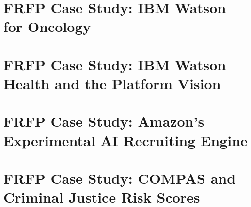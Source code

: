 \documentclass[11pt,oneside]{book}
\begin{document}

%





\chapter{FRFP Case Study: IBM Watson for Oncology}
\label{ch:cs-watson-oncology}


\chapter{FRFP Case Study: IBM Watson Health and the Platform Vision}
\label{ch:cs-watson-health}


\chapter{FRFP Case Study: Amazon's Experimental AI Recruiting Engine}
\label{ch:cs-amazon-recruiting}


\chapter{FRFP Case Study: COMPAS and Criminal Justice Risk Scores}
\label{ch:cs-compas}

\end{document}
